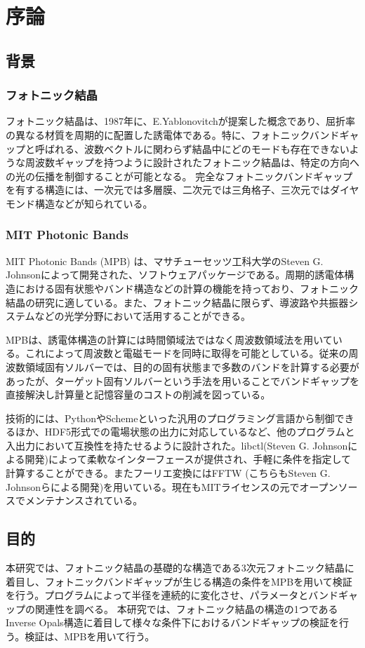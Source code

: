 \documentclass[platex,dvipdfmx]{jsreport}
\begin{document}
\chapter{序論}


\section{背景}

\subsection{フォトニック結晶}


フォトニック結晶は、1987年に、E.Yablonovitchが提案した概念であり、屈折率の異なる材質を周期的に配置した誘電体である。特に、フォトニックバンドギャップと呼ばれる、波数ベクトルに関わらず結晶中にどのモードも存在できないような周波数ギャップを持つように設計されたフォトニック結晶は、特定の方向への光の伝播を制御することが可能となる。
完全なフォトニックバンドギャップを有する構造には、一次元では多層膜、二次元では三角格子、三次元ではダイヤモンド構造などが知られている。


\subsection{MIT Photonic Bands}

MIT Photonic Bands (MPB) は、マサチューセッツ工科大学のSteven G. Johnsonによって開発された、ソフトウェアパッケージである。周期的誘電体構造における固有状態やバンド構造などの計算の機能を持っており、フォトニック結晶の研究に適している。また、フォトニック結晶に限らず、導波路や共振器システムなどの光学分野において活用することができる。

MPBは、誘電体構造の計算には時間領域法ではなく周波数領域法を用いている。これによって周波数と電磁モードを同時に取得を可能としている。従来の周波数領域固有ソルバーでは、目的の固有状態まで多数のバンドを計算する必要があったが、ターゲット固有ソルバーという手法を用いることでバンドギャップを直接解決し計算量と記憶容量のコストの削減を図っている。


技術的には、PythonやSchemeといった汎用のプログラミング言語から制御できるほか、HDF5形式での電場状態の出力に対応しているなど、他のプログラムと入出力において互換性を持たせるように設計された。libctl(Steven G. Johnsonによる開発)によって柔軟なインターフェースが提供され、手軽に条件を指定して計算することができる。またフーリエ変換にはFFTW (こちらもSteven G. Johnsonらによる開発)を用いている。現在もMITライセンスの元でオープンソースでメンテナンスされている。


\section{目的}
本研究では、フォトニック結晶の基礎的な構造である3次元フォトニック結晶に着目し、フォトニックバンドギャップが生じる構造の条件をMPBを用いて検証を行う。プログラムによって半径を連続的に変化させ、パラメータとバンドギャップの関連性を調べる。
本研究では、フォトニック結晶の構造の1つであるInverse Opals構造に着目して様々な条件下におけるバンドギャップの検証を行う。検証は、MPBを用いて行う。
\end{document}
